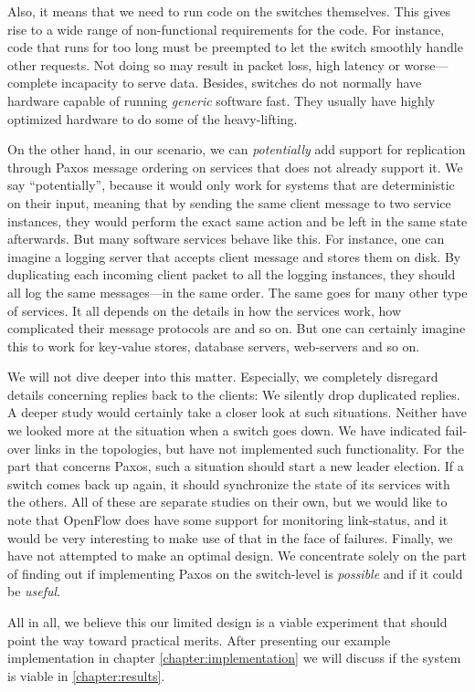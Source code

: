 Also, it means that we need to run code on the switches themselves. This
gives rise to a wide range of non-functional requirements for the code.
For instance, code that runs for too long must be
preempted to let the switch smoothly handle other
requests. Not doing so may result in packet loss, high latency or
worse---complete incapacity to serve data. Besides, switches do not normally
have hardware capable of running \textit{generic} software fast. They
usually have highly optimized hardware to do some of the heavy-lifting.

On the other hand, in our scenario, we can \textit{potentially} add support
for replication through Paxos message ordering on services that does not
already support it.
%
We say ``potentially'', because it would only work for systems that are
deterministic on their input, meaning that by sending the same client
message to two service instances, they would perform the exact same action
and be left in the same state afterwards.
%
But many software services behave like this. For instance, one can imagine a
logging server that accepts client message and stores them on disk.
By duplicating each incoming client packet to all the logging instances,
they should all log the same messages---in the same order.
%
The same goes for many other type of services.  It all depends on the
details in how the services work, how complicated their message protocols
are and so on.  But one can certainly imagine this to work for key-value
stores, database servers, web-servers and so on.

We will not dive deeper into this matter.  Especially, we completely
disregard details concerning replies back to the clients: We silently
drop duplicated replies.  A deeper study would certainly take a closer
look at such situations.
%
Neither have we looked more at the situation when a switch goes down.
We have indicated fail-over links in the topologies, but have not
implemented such functionality.  For the part that concerns Paxos, such a
situation should start a new leader election.  If a switch comes back up
again, it should synchronize the state of its services with the others.
All of these are separate studies on their own, but we would like to note
that OpenFlow does have some support for monitoring link-status, and it
would be very interesting to make use of that in the face of failures.
%
Finally, we have not attempted to make an optimal design.  We concentrate
solely on the part of finding out if implementing Paxos on the switch-level
is \textit{possible} and if it could be \textit{useful}.

All in all, we believe this our limited design is a viable experiment that
should point the way toward practical merits.  After presenting our example
implementation in chapter \ref{chapter:implementation} we will discuss if
the system is viable in \ref{chapter:results}.
